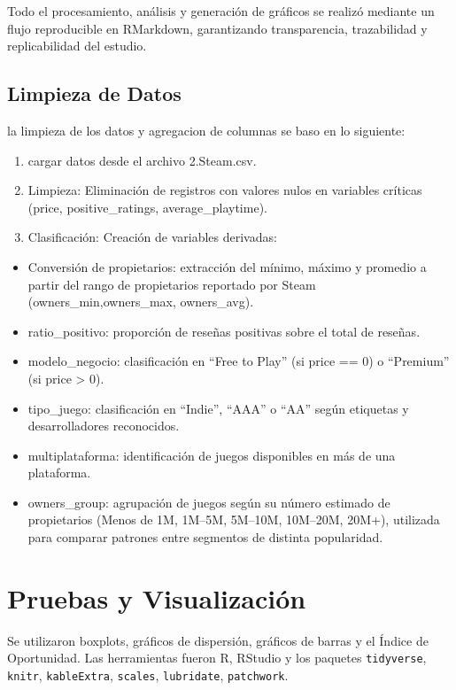 \documentclass[oneside,11pt]{Latex/Classes/PhDthesisPSnPDF}
\begin{document}
Todo el procesamiento, análisis y generación de gráficos se realizó
mediante un flujo reproducible en RMarkdown, garantizando transparencia,
trazabilidad y replicabilidad del estudio.

\subsection{Limpieza de Datos}

la limpieza de los datos y agregacion de columnas se baso en lo
siguiente:

\begin{enumerate}
\def\labelenumi{\arabic{enumi}.}
\item
  cargar datos desde el archivo 2.Steam.csv.
\item
  Limpieza: Eliminación de registros con valores nulos en variables
  críticas (price, positive\_ratings, average\_playtime).
\item
  Clasificación: Creación de variables derivadas:
\end{enumerate}

\begin{itemize}
\item
  Conversión de propietarios: extracción del mínimo, máximo y promedio a
  partir del rango de propietarios reportado por Steam
  (owners\_min,owners\_max, owners\_avg).
\item
  ratio\_positivo: proporción de reseñas positivas sobre el total de
  reseñas.
\item
  modelo\_negocio: clasificación en ``Free to Play'' (si price == 0) o
  ``Premium'' (si price \textgreater{} 0).
\item
  tipo\_juego: clasificación en ``Indie'', ``AAA'' o ``AA'' según
  etiquetas y desarrolladores reconocidos.
\item
  multiplataforma: identificación de juegos disponibles en más de una
  plataforma.
\item
  owners\_group: agrupación de juegos según su número estimado de
  propietarios (Menos de 1M, 1M--5M, 5M--10M, 10M--20M, 20M+), utilizada
  para comparar patrones entre segmentos de distinta popularidad.
\end{itemize}

\section{Pruebas y Visualización}

Se utilizaron boxplots, gráficos de dispersión, gráficos de barras y el
Índice de Oportunidad. Las herramientas fueron R, RStudio y los paquetes
\texttt{tidyverse}, \texttt{knitr}, \texttt{kableExtra},
\texttt{scales}, \texttt{lubridate}, \texttt{patchwork}.
\end{document}
